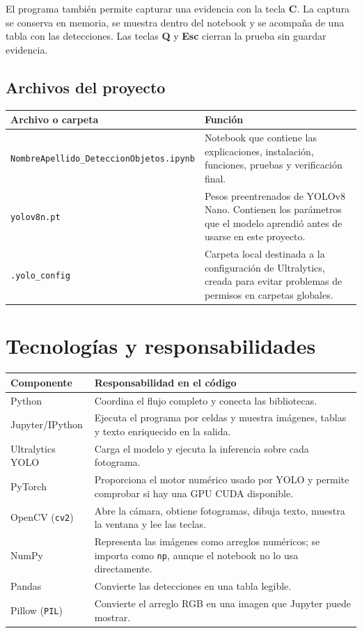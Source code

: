 \documentclass[11pt,a4paper]{article}
\newcommand{\archivo}[1]{\nolinkurl{#1}}
\begin{document}
El programa también permite capturar una evidencia con la tecla \textbf{C}.
La captura se conserva en memoria, se muestra dentro del notebook y se acompaña
de una tabla con las detecciones. Las teclas \textbf{Q} y \textbf{Esc} cierran
la prueba sin guardar evidencia.

\subsection{Archivos del proyecto}

\begin{tabularx}{\textwidth}{>{\raggedright\arraybackslash}p{} X}
\toprule
\textbf{Archivo o carpeta} & \textbf{Función} \\
\midrule
\archivo{NombreApellido_DeteccionObjetos.ipynb} &
Notebook que contiene las explicaciones, instalación, funciones, pruebas y
verificación final. \\
\archivo{yolov8n.pt} &
Pesos preentrenados de YOLOv8 Nano. Contienen los parámetros que el modelo
aprendió antes de usarse en este proyecto. \\
\archivo{.yolo_config} &
Carpeta local destinada a la configuración de Ultralytics, creada para evitar
problemas de permisos en carpetas globales. \\
\bottomrule
\end{tabularx}

\section{Tecnologías y responsabilidades}

\begin{longtable}{>{\raggedright\arraybackslash}p{}
                  >{\raggedright\arraybackslash}p{}}
\toprule
\textbf{Componente} & \textbf{Responsabilidad en el código} \\
\midrule
\endhead
Python & Coordina el flujo completo y conecta las bibliotecas. \\
Jupyter/IPython & Ejecuta el programa por celdas y muestra imágenes, tablas y
texto enriquecido en la salida. \\
Ultralytics YOLO & Carga el modelo y ejecuta la inferencia sobre cada
fotograma. \\
PyTorch & Proporciona el motor numérico usado por YOLO y permite comprobar si
hay una GPU CUDA disponible. \\
OpenCV (\texttt{cv2}) & Abre la cámara, obtiene fotogramas, dibuja texto,
muestra la ventana y lee las teclas. \\
NumPy & Representa las imágenes como arreglos numéricos; se importa como
\texttt{np}, aunque el notebook no lo usa directamente. \\
Pandas & Convierte las detecciones en una tabla legible. \\
Pillow (\texttt{PIL}) & Convierte el arreglo RGB en una imagen que Jupyter
puede mostrar. \\
\bottomrule
\end{longtable}
\end{document}
